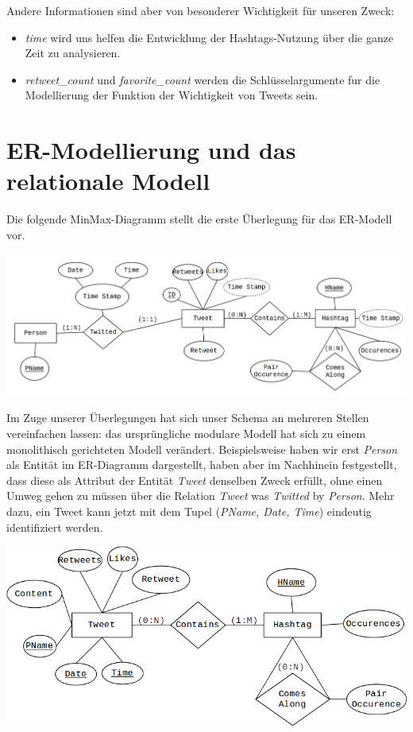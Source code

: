 \documentclass[paper=a4, english, ngerman, romanian]{scrartcl}
\begin{document}
		Andere Informationen sind aber von besonderer Wichtigkeit für unseren Zweck:
		
		\begin{itemize}
		\item \textit{time} wird uns helfen die Entwicklung der Hashtags-Nutzung über die ganze Zeit zu analysieren. 
		\item \textit{retweet\_count} und \textit{favorite\_count} werden die Schlüsselargumente fur die Modellierung der Funktion der Wichtigkeit von Tweets sein.
		\end{itemize}
		
		\pagebreak

\section{ER-Modellierung und das relationale Modell}
	
	Die folgende MinMax-Diagramm stellt die erste Überlegung für das ER-Modell vor. 
	\begin{center}
	\includegraphics[scale=0.2]{MinMax_Diagram.png}
	\end{center}

	
	Im Zuge unserer Überlegungen hat sich unser Schema an mehreren Stellen vereinfachen lassen: das ursprüngliche modulare Modell hat sich zu einem monolithisch gerichteten Modell verändert. Beispielsweise haben wir erst \textit{Person} als Entität im ER-Diagramm dargestellt, haben aber im Nachhinein festgestellt, dass diese als Attribut der Entität \textit{Tweet} denselben Zweck erfüllt, ohne einen Umweg gehen zu müssen über die Relation \textit{Tweet} was \textit{Twitted} by \textit{Person}. Mehr dazu, ein Tweet kann jetzt mit dem Tupel (\textit{PName, Date, Time}) eindeutig identifiziert werden.
		
	\begin{center}
	\includegraphics[scale=0.6]{MinMax_Diagram2}
	\end{center}
	
\end{document}
